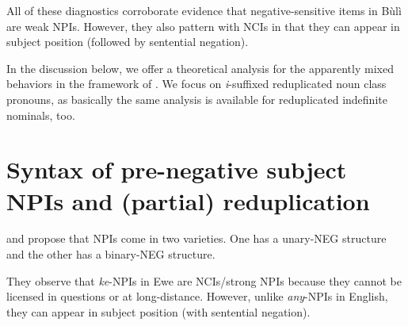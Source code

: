 \documentclass[output=paper,colorlinks,citecolor=brown]{langscibook}
\begin{document}
All of these diagnostics corroborate evidence that negative-sensitive items in Bùlì are weak NPIs. However, they also pattern with NCIs in that they can appear in subject position (followed by sentential negation).

\z

\z


In the discussion below, we offer a theoretical analysis for the apparently mixed behaviors in the framework of \cite{CollinsPostal2014}. We focus on \textit{i}-suffixed reduplicated noun class pronouns, as basically the same analysis is available for reduplicated indefinite nominals, too.


\section{Syntax of pre-negative subject NPIs and (partial) reduplication}

\cite{CollinsPostal2014} and \cite{CollinsEtAl2017} propose that NPIs come in two varieties. One has a unary-NEG structure and the other has a binary-NEG structure.

\ea
{}
\z
\z

They observe that \textit{ke}-NPIs in Ewe are NCIs/strong NPIs because they cannot be licensed in questions or at long-distance. However, unlike \textit{any}-NPIs in English, they can appear in subject position (with sentential negation).

\ea
{}
\z
\z
\end{document}
